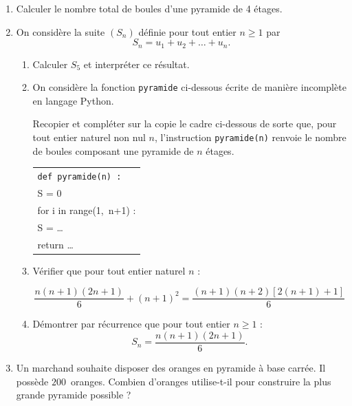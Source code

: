 \documentclass[10pt]{article}
\begin{document}
\begin{enumerate}
\item Calculer le nombre total de boules d'une pyramide de 4 étages.
\item On considère la suite $\left(S_n\right)$ définie pour tout entier $n \geqslant 1$ par 
\[S_n = u_1 + u_2 + \ldots + u_n.\]

	\begin{enumerate}
		\item Calculer $S_5$ et interpréter ce résultat.
		\item On considère la fonction \texttt{pyramide} ci-dessous écrite de manière incomplète en langage Python.
		
Recopier et compléter sur la copie le cadre ci-dessous de sorte que, pour tout entier naturel non nul $n$, l'instruction \texttt{pyramide(n)} renvoie le nombre de boules composant une pyramide de $n$ étages.

\begin{center}

\begin{tabular}{|l|}\hline
\texttt{def pyramide(n) :}\\
\qquad S = 0\\
\qquad for i in range(1,~n+1) :\\
\qquad \qquad S = \ldots\\
\qquad return \ldots\\ \hline
\end{tabular}

\end{center}

		\item Vérifier que pour tout entier naturel $n$ :

\[\dfrac{n(n+1)(2n+1)}{6} + (n+1)^2 = \dfrac{(n + 1)(n +2)[2(n + 1) + 1]}{6}\]
		\item Démontrer par récurrence que pour tout entier $n \geqslant 1$ : 
\[S_n = \dfrac{n(n + 1)(2n + 1)}{6}.\]

	\end{enumerate}
\item Un marchand souhaite disposer des oranges en pyramide à base carrée. Il possède $200$~oranges. Combien d'oranges utilise-t-il pour construire la plus grande pyramide possible ?
\end{enumerate}

\bigskip
\end{document}
